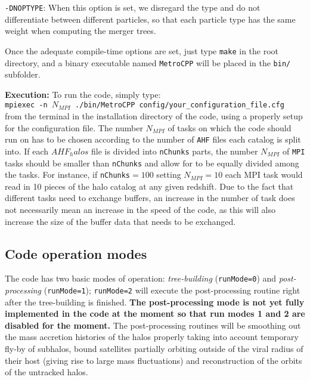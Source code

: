 \documentclass{article}
\begin{document}
\noindent
\texttt{-DNOPTYPE}: When this option is set, we disregard the type and do not differentiate between different particles, so that
each particle type has the same weight when computing the merger trees.

Once the adequate compile-time options are set, just type \texttt{make} in the root directory, and a binary executable named 
\texttt{MetroCPP} will be placed in the \texttt{bin/} subfolder. 



\textbf{Execution:}
To run the code, simply type:\\

\texttt{mpiexec -n $N_{MPI}$ ./bin/MetroCPP config/your\_configuration\_file.cfg}\\

\noindent
from the terminal in the installation directory of the code, using a properly setup for the configuration file.
The number $N_{MPI}$ of tasks on which the code should run on has to be chosen according to the number of \texttt{AHF} files each catalog
is split into. If each $AHF_halos$ file is divided into \texttt{nChunks} parts, the number $N_{MPI}$ 
of \texttt{MPI} tasks should be smaller than \texttt{nChunks} and allow for to be equally divided among the tasks.
For instance, if \texttt{nChunks}$=100$ setting $N_{MPI} = 10$ each MPI task would read in 10 pieces of the 
halo catalog at any given redshift.
Due to the fact that different tasks need to exchange buffers, an increase in the number of task does not necessarily mean
an increase in the speed of the code, as this will also increase the size of the buffer data that needs to be exchanged.



\subsection{Code operation modes}

The code has two basic modes of operation: \emph{tree-building} (\texttt{runMode=0}) and \emph{post-processing}
(\texttt{runMode=1}); \texttt{runMode=2} will execute the post-processing routine right after the tree-building is finished.
\textbf{The post-processing mode is not yet fully implemented in the code at the moment so that run modes 1 and 2 are disabled 
for the moment.} The post-processing routines will be smoothing out the mass accretion histories of the halos properly taking into 
account temporary fly-by of subhalos, bound satellites partially orbiting outside of the viral radius of their host (giving rise
to large mass fluctuations) and reconstruction of the orbits of the untracked halos.
\end{document}
